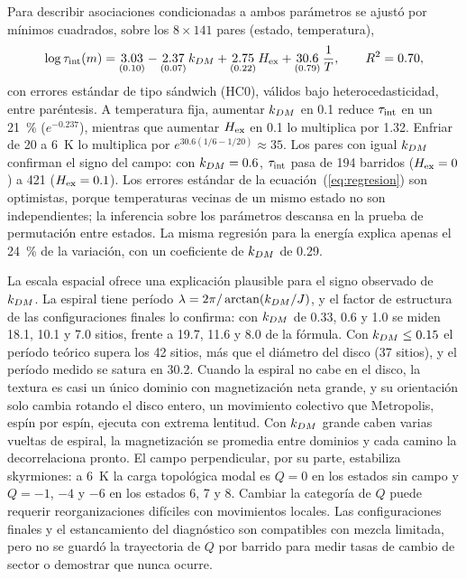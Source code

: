 Para describir asociaciones condicionadas a ambos parámetros se ajustó por mínimos cuadrados, sobre los $8\times141$ pares (estado, temperatura),
\begin{equation}
\log\tau_{\mathrm{int}}(m)=\underset{(0.10)}{3.03}-\underset{(0.07)}{2.37}\,k_{DM}+\underset{(0.22)}{2.75}\,H_{\mathrm{ex}}+\underset{(0.79)}{30.6}\,\frac1T,\qquad R^2=0.70,
\label{eq:regresion}
\end{equation}
con errores estándar de tipo sándwich (HC0), válidos bajo heterocedasticidad, entre paréntesis. A temperatura fija, aumentar $k_{DM}$ en 0.1 reduce $\tau_{\mathrm{int}}$ en un 21~\% ($e^{-0.237}$), mientras que aumentar $H_{\mathrm{ex}}$ en 0.1 lo multiplica por 1.32. Enfriar de 20 a 6~K lo multiplica por $e^{30.6(1/6-1/20)}\approx35$. Los pares con igual $k_{DM}$ confirman el signo del campo: con $k_{DM}=0.6$, $\tau_{\mathrm{int}}$ pasa de 194 barridos ($H_{\mathrm{ex}}=0$) a 421 ($H_{\mathrm{ex}}=0.1$). Los errores estándar de la ecuación~(\ref{eq:regresion}) son optimistas, porque temperaturas vecinas de un mismo estado no son independientes; la inferencia sobre los parámetros descansa en la prueba de permutación entre estados. La misma regresión para la energía explica apenas el 24~\% de la variación, con un coeficiente de $k_{DM}$ de 0.29.

La escala espacial ofrece una explicación plausible para el signo observado de $k_{DM}$. La espiral tiene período $\lambda=2\pi/\arctan(k_{DM}/J)$, y el factor de estructura de las configuraciones finales lo confirma: con $k_{DM}$ de 0.33, 0.6 y 1.0 se miden 18.1, 10.1 y 7.0 sitios, frente a 19.7, 11.6 y 8.0 de la fórmula. Con $k_{DM}\le0.15$ el período teórico supera los 42 sitios, más que el diámetro del disco (37 sitios), y el período medido se satura en 30.2. Cuando la espiral no cabe en el disco, la textura es casi un único dominio con magnetización neta grande, y su orientación solo cambia rotando el disco entero, un movimiento colectivo que Metropolis, espín por espín, ejecuta con extrema lentitud. Con $k_{DM}$ grande caben varias vueltas de espiral, la magnetización se promedia entre dominios y cada camino la decorrelaciona pronto. El campo perpendicular, por su parte, estabiliza skyrmiones: a 6~K la carga topológica modal es $Q=0$ en los estados sin campo y $Q=-1$, $-4$ y $-6$ en los estados 6, 7 y 8. Cambiar la categoría de $Q$ puede requerir reorganizaciones difíciles con movimientos locales. Las configuraciones finales y el estancamiento del diagnóstico son compatibles con mezcla limitada, pero no se guardó la trayectoria de $Q$ por barrido para medir tasas de cambio de sector o demostrar que nunca ocurre.

